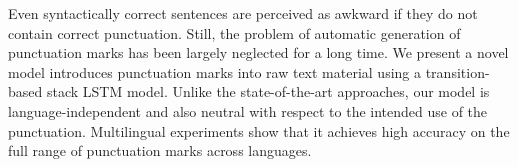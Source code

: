 Even syntactically correct sentences are perceived as awkward if they do not contain correct punctuation. Still, the problem of automatic generation of punctuation marks  has been  largely neglected for a long time. We present a novel model introduces punctuation marks into raw text material using a transition-based stack LSTM model. Unlike the state-of-the-art approaches, our model is language-independent and also neutral with respect to the intended use of the punctuation. Multilingual experiments show that it achieves high accuracy on the full range of punctuation marks across languages.

